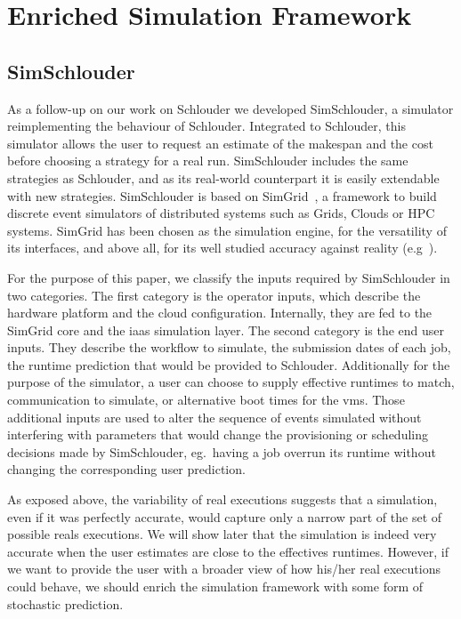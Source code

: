 \documentclass[10pt,conference,compsocconf]{IEEEtran}
\begin{document}
\section{Enriched Simulation Framework}
\label{sec:enriched-sim}

\subsection{SimSchlouder}

As a follow-up on our work on Schlouder we developed SimSchlouder, a simulator
reimplementing the behaviour of Schlouder. Integrated to Schlouder, this
simulator allows the user to request an estimate of the makespan and the cost
before choosing a strategy for a real run. SimSchlouder includes the same
strategies as Schlouder, and as its real-world counterpart it is easily
extendable with new strategies. SimSchlouder is based on SimGrid~\cite{simgrid},
a framework to build discrete event simulators of distributed systems such as
Grids, Clouds or HPC systems. SimGrid has been chosen as the simulation engine,
for the versatility of its interfaces, and above all, for its well studied
accuracy against reality (e.g~\cite{StanisicTLVM15,VelhoSCL13}).


For the purpose of this paper, we classify the inputs required by SimSchlouder
in two categories. The first category is the operator inputs, which describe the
hardware platform and the cloud configuration. Internally, they are fed to the
SimGrid core and the \ac{iaas} simulation layer. The second category is the end
user inputs. They describe the workflow to simulate, the submission dates of
each job, the runtime prediction that would be provided to Schlouder.
Additionally for the purpose of the simulator, a user can choose to supply
effective runtimes to match, communication to simulate, or alternative boot
times for the \acp{vm}. Those additional inputs are used to alter the sequence
of events simulated without interfering with parameters that would change the
provisioning or scheduling decisions made by SimSchlouder, eg.\ having a job
overrun its runtime without changing the corresponding user prediction.

As exposed above, the variability of real executions suggests that a simulation,
even if it was  perfectly accurate, would capture only a narrow  part of the set
of possible reals  executions. We will show later that  the simulation is indeed
very   accurate  when   the  user   estimates  are   close  to   the  effectives
runtimes. However,  if we want to  provide the user  with a broader view  of how
his/her real executions could behave,  we should enrich the simulation framework
with some form of stochastic prediction.
\end{document}
